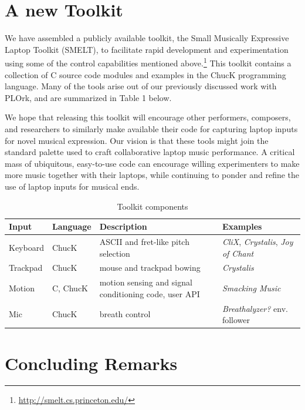 \section{A new Toolkit}
We have assembled a publicly available toolkit, the Small Musically Expressive
Laptop Toolkit (SMELT), to facilitate rapid development and experimentation using
some of the control capabilities mentioned above.\footnote{\url{http://smelt.cs.princeton.edu/}} This toolkit contains a collection of C source
code modules and examples in the ChucK programming language. Many of the tools
arise out of our previously discussed work with PLOrk, and are summarized in
Table 1 below. 

We hope that releasing this toolkit will encourage other performers, composers,
and researchers to similarly make available their code for capturing laptop
inputs for novel musical expression. Our vision is that these tools might join
the standard palette used to craft collaborative laptop music performance. A
critical mass of ubiquitous, easy-to-use code can encourage willing experimenters
to make more music together with their laptops, while continuing to ponder and
refine the use of laptop inputs for musical ends.

\begin{center}
\begin{table}[t]
\setlength{\tabcolsep}{12pt}
\caption{Toolkit components}
\vspace{3pt} \noindent
\begin{tabular}{p{40pt}p{45pt}p{70pt}p{60pt}}
\toprule
\textbf{Input}     & \textbf{Language}  & \textbf{Description}  & \textbf{Examples} \\
\midrule  
Keyboard & ChucK & {\small ASCII and fret-like pitch selection} & \textit{CliX}, \textit{Crystalis}, \textit{Joy of Chant} \\
Trackpad & ChucK & mouse and trackpad bowing & \textit{Crystalis}\\
Motion & C, ChucK & {\small motion sensing and signal conditioning code, user API} & \textit{Smacking Music} \\
Mic & ChucK & breath control & \textit{Breathalyzer?} env. follower \\
\bottomrule
\end{tabular}
\end{table}
\end{center}

\section{Concluding Remarks}

